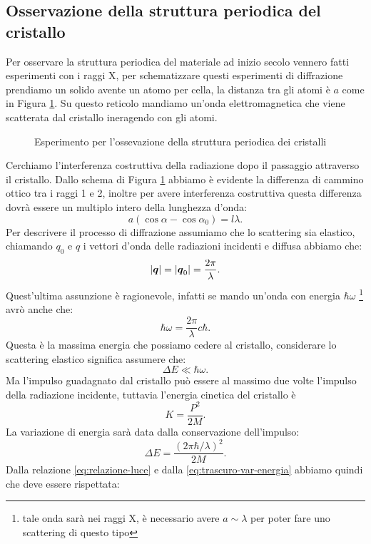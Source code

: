 \subsection{Osservazione della struttura periodica del cristallo}
\label{subsec:Osservazione della struttura periodica del cristallo}
Per osservare la struttura periodica del materiale ad inizio secolo vennero fatti esperimenti con i raggi X, per schematizzare questi esperimenti di diffrazione prendiamo un solido avente un atomo per cella, la distanza tra gli atomi è $a$ come in Figura \ref{fig:esperimento-per-osservazione-struttura-cristallo}. Su questo reticolo mandiamo un'onda elettromagnetica che viene scatterata dal cristallo ineragendo con gli atomi.
\begin{figure}[ht]
    \centering
    \caption{Esperimento per l'ossevazione della struttura periodica dei cristalli}
    \label{fig:esperimento-per-osservazione-struttura-cristallo}
\end{figure}
Cerchiamo l'interferenza costruttiva della radiazione dopo il passaggio attraverso il cristallo. Dallo schema di Figura \ref{fig:esperimento-per-osservazione-struttura-cristallo} abbiamo è evidente la differenza di cammino ottico tra i raggi 1 e 2, inoltre per avere interferenza costruttiva questa differenza dovrà essere un multiplo intero della lunghezza d'onda:
\[
	a\left( \cos\alpha-\cos\alpha_0 \right) = l \lambda
.\] 
Per descrivere il processo di diffrazione assumiamo che lo scattering sia elastico, chiamando $q_0$ e $q$ i vettori d'onda delle radiazioni incidenti e diffusa abbiamo che:
\[
	\left| \boldsymbol{q} \right| = \left| \boldsymbol{q}_0 \right| = \frac{2\pi}{\lambda}
.\] 
Quest'ultima assunzione è ragionevole, infatti se mando un'onda con energia $\hbar \omega$ \footnote{tale onda sarà nei raggi X, è necessario avere $a \sim \lambda $ per poter fare uno scattering di questo tipo} avrò anche che:
\[
	\hbar \omega= \frac{2\pi}{\lambda}c\hbar \label{eq:relazione-luce}
.\] 
Questa è la massima energia che possiamo cedere al cristallo, considerare lo scattering elastico significa assumere che:
\[
	\Delta E\ll\hbar \omega \label{eq:trascuro-var-energia}
.\] 
Ma l'impulso guadagnato dal cristallo può essere al massimo due volte l'impulso della radiazione incidente, tuttavia l'energia cinetica del cristallo è 
\[
	K = \frac{P^2}{2M}
.\] 
La variazione di energia sarà data dalla conservazione dell'impulso:
\[
	\Delta E = \frac{\left( 2\pi\hbar /\lambda \right)^2}{2M}
.\] 
Dalla relazione \ref{eq:relazione-luce} e dalla \ref{eq:trascuro-var-energia} abbiamo quindi che deve essere rispettata:
